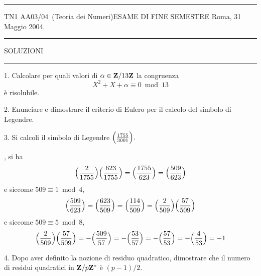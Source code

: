 \nopagenumbers \hrule\bigskip
 \hskip -6mm TN1 AA03/04\ (Teoria dei Numeri)\hfill ESAME DI
FINE SEMESTRE \hfill Roma, 31 Maggio 2004. \bigskip\hrule
\bigskip
\centerline{SOLUZIONI}\bigskip\hrule \bigskip\bigskip

\item{1.} Calcolare per quali valori di $\alpha\in{{\bf Z}/13 {\bf
Z}}$ la congruenza $$X^2+X+\alpha\equiv0\bmod 13$$ \`{e} risolubile.

\bigskip

\item{2.} Enunciare e dimostrare il criterio di Eulero per il
calcolo del simbolo di Legendre.

\bigskip

\item{3.} Si calcoli il simbolo di Legendre
$\Big({1755\over3001}\Big).$

, si ha
$$\Big({2\over1755}\Big)\Big({623\over1755}\Big)=\Big({1755\over623}\Big)=
\Big({509\over623}\Big)$$ e siccome $509\equiv1\bmod4$,
$$\Big({509\over623}\Big)=\Big({623\over509}\Big)=\Big({114\over509}\Big)
=\Big({2\over509}\Big)\Big({57\over509}\Big)$$ e siccome
$509\equiv5\bmod8$,
$$\Big({2\over509}\Big)\Big({57\over509}\Big)=-\Big({509\over57}\Big)
=-\Big({53\over57}\Big)=-\Big({57\over53}\Big)=-\Big({4\over53}\Big)=-1$$
\bigskip

\item{4.} Dopo aver definito la nozione di residuo quadratico, dimostrare che il numero di
residui quadratici in ${\bf Z}/p{\bf Z}^*$ \`{e} $(p-1)/2$.

\bigskip

